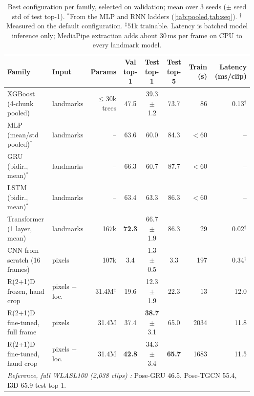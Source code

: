 \documentclass{article}
\begin{document}
\begin{table}[t]
\centering\footnotesize
\begin{tabular}{llrcccrr}
\toprule
Family & Input & Params & Val top-1 & Test top-1 & Test top-5 & Train (s) & Latency (ms/clip) \\
\midrule
XGBoost (4-chunk pooled)       & landmarks & $\le$30k trees & 47.5 & 39.3 $\pm$ 1.2 & 73.7 & 86 & 0.13$^\dagger$ \\
MLP (mean/std pooled)$^\ast$   & landmarks & --   & 63.6 & 60.0 & 84.3 & $<$60 & -- \\
GRU (bidir., mean)$^\ast$      & landmarks & --   & 66.3 & 60.7 & 87.7 & $<$60 & -- \\
LSTM (bidir., mean)$^\ast$     & landmarks & --   & 63.4 & 63.3 & 86.3 & $<$60 & -- \\
Transformer (1 layer, mean)    & landmarks & 167k & \textbf{72.3} & 66.7 $\pm$ 1.9 & 86.3 & 29 & 0.02$^\dagger$ \\
\midrule
CNN from scratch (16 frames)   & pixels    & 107k & 3.4 & 1.3 $\pm$ 0.5 & 3.3 & 197 & 0.34$^\dagger$ \\
R(2+1)D frozen, hand crop      & pixels + loc. & 31.4M$^\ddagger$ & 19.6 & 12.3 $\pm$ 1.9 & 22.3 & 13 & 12.0 \\
R(2+1)D fine-tuned, full frame & pixels    & 31.4M & 37.4 & \textbf{38.7} $\pm$ 3.1 & 65.0 & 2034 & 11.8 \\
R(2+1)D fine-tuned, hand crop  & pixels + loc. & 31.4M & \textbf{42.8} & 34.3 $\pm$ 3.4 & \textbf{65.7} & 1683 & 11.5 \\
\midrule
\multicolumn{8}{l}{\emph{Reference, full WLASL100 (2{,}038 clips) \citep{li2020wlasl}:} Pose-GRU 46.5, Pose-TGCN 55.4, I3D 65.9 test top-1.} \\
\bottomrule
\end{tabular}
\caption{Best configuration per family, selected on validation; mean over 3 seeds ($\pm$ seed std of test
top-1). $^\ast$From the MLP and RNN ladders (\cref{tab:pooled,tab:seq}). $^\dagger$Measured on the
default configuration. $^\ddagger$51k trainable. Latency is batched model inference only; MediaPipe
extraction adds about 30\,ms per frame on CPU to every landmark model.}
\label{tab:main}
\end{table}

\end{document}
